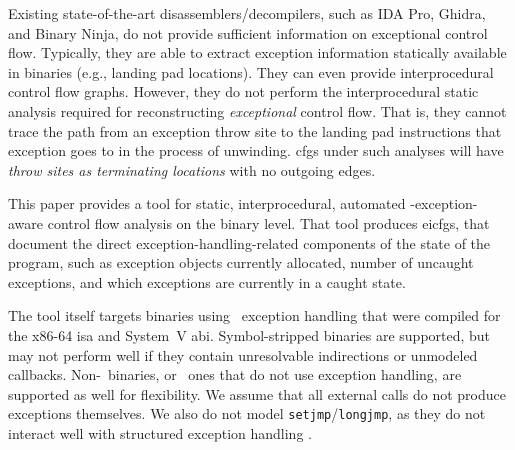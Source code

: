 Existing state-of-the-art disassemblers/decompilers, such as IDA Pro, Ghidra, and Binary Ninja, do not provide sufficient information on exceptional control flow.
Typically, they are able to extract exception information statically available in binaries (e.g., landing pad locations).
They can even provide interprocedural control flow graphs.
However, they do not perform the interprocedural static analysis required for reconstructing \emph{exceptional} control flow.
That is, they cannot trace the path from an exception throw site to the landing pad instructions that exception goes to in the process of unwinding.
\Acp{cfg} under such analyses will have \emph{throw sites as terminating locations} with no outgoing edges.

This paper provides a tool for static, interprocedural, automated \Cpp-exception-aware control flow analysis on the binary level.
That tool produces \acp{eicfg}, that document the direct exception-handling-related components of the state of the program, such as exception objects currently allocated, number of uncaught exceptions, and which exceptions are currently in a caught state.


The tool itself targets binaries using \Cpp\ exception handling%
that were compiled for the x86-64 \ac{isa} and System~V \ac{abi}.
Symbol-stripped binaries are supported, but may not perform well if they contain unresolvable indirections or unmodeled callbacks.
Non-\Cpp\ binaries, or \Cpp\ ones that do not use exception handling, are supported as well for flexibility.
We assume that all external calls do not produce exceptions themselves.
We also do not model \lstinline{setjmp}/\lstinline{longjmp}, as they do not interact well with structured exception handling \autocite{using-setjmp-and-longjmp}.

